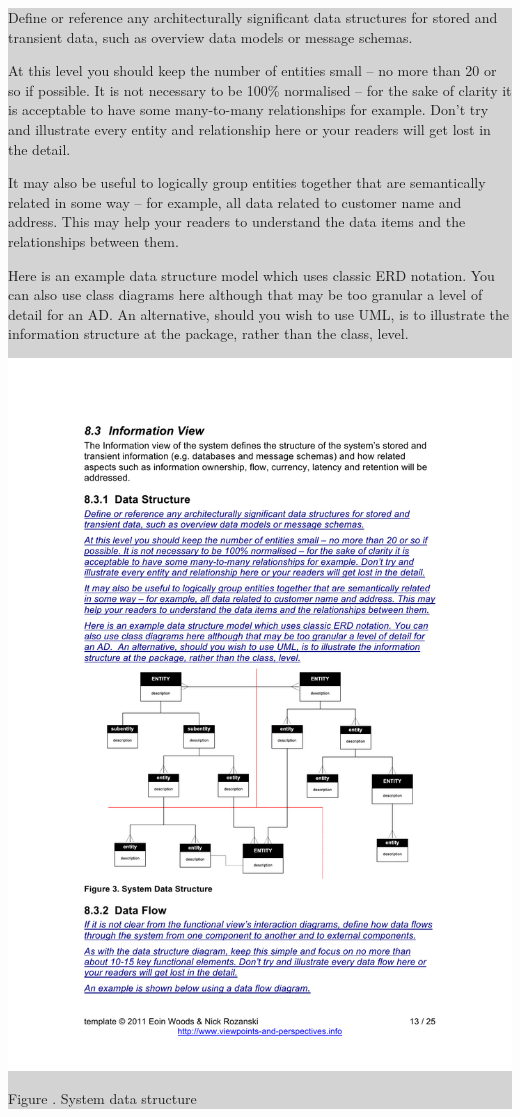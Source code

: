 \documentclass[a4paper,11pt]{report}
\newcommand{\instructions}[1]{
  \noindent\colorbox{lightgray}{%
    \parbox{\linewidth}{%
      #1
    }%
  }%
 \vspace{0.1cm}
}
\newcommand{\mycaption}[1]{
  \addtocounter{figures}{1}
  Figure \arabic{figures}. #1
}
\begin{document}
\instructions{
Define or reference any architecturally significant data structures
for stored and transient data, such as overview data models or message
schemas.

At this level you should keep the number of entities small – no more
than 20 or so if possible. It is not necessary to be 100\% normalised
– for the sake of clarity it is acceptable to have some many-to-many
relationships for example. Don’t try and illustrate every entity and
relationship here or your readers will get lost in the detail.

It may also be useful to logically group entities together that are
semantically related in some way – for example, all data related to
customer name and address. This may help your readers to understand
the data items and the relationships between them.

Here is an example data structure model which uses classic ERD
notation. You can also use class diagrams here although that may be
too granular a level of detail for an AD. An alternative, should you
wish to use UML, is to illustrate the information structure at the
package, rather than the class, level.

\begin{center}
  \includegraphics[width=\textwidth]{figures/systemdatastructure}\\
  \mycaption{System data structure}
\end{center}

}
\end{document}
